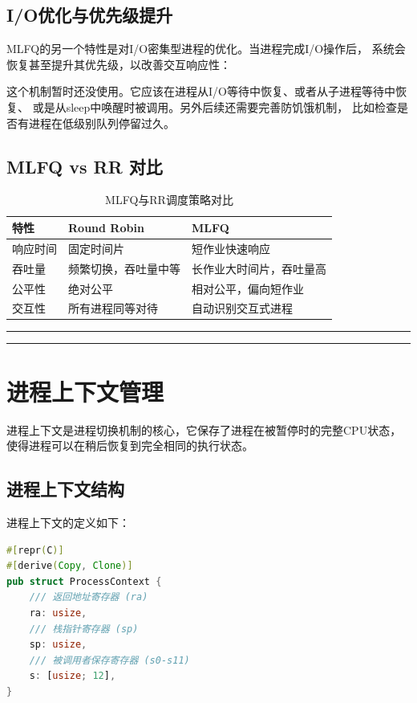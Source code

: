 \subsection{I/O优化与优先级提升}

MLFQ的另一个特性是对I/O密集型进程的优化。当进程完成I/O操作后，
系统会恢复甚至提升其优先级，以改善交互响应性：

这个机制暂时还没使用。它应该在进程从I/O等待中恢复、或者从子进程等待中恢复、
或是从sleep中唤醒时被调用。另外后续还需要完善防饥饿机制，
比如检查是否有进程在低级别队列停留过久。

\subsection{MLFQ vs RR 对比}

\begin{table}[htbp]
\centering
\caption{MLFQ与RR调度策略对比}
\label{tab:mlfq-vs-rr}
\begin{tabular}{|l|l|l|}
\hline
\textbf{特性} & \textbf{Round Robin} & \textbf{MLFQ} \\
\hline
响应时间 & 固定时间片 & 短作业快速响应 \\
\hline
吞吐量 & 频繁切换，吞吐量中等 & 长作业大时间片，吞吐量高 \\
\hline
公平性 & 绝对公平 & 相对公平，偏向短作业 \\
\hline
交互性 & 所有进程同等对待 & 自动识别交互式进程 \\
\hline
\end{tabular}
\end{table}

\noindent
\rule{0.4\textwidth}{0.4pt}
\hfill
{}
\hfill
\rule{0.4\textwidth}{0.4pt}

\section{进程上下文管理}

进程上下文是进程切换机制的核心，它保存了进程在被暂停时的完整CPU状态，
使得进程可以在稍后恢复到完全相同的执行状态。

\subsection{进程上下文结构}

进程上下文的定义如下：

\begin{lstlisting}[language=Rust,caption={进程上下文结构}, label={lst:process-context}]
#[repr(C)]
#[derive(Copy, Clone)]
pub struct ProcessContext {
    /// 返回地址寄存器 (ra)
    ra: usize,
    /// 栈指针寄存器 (sp)
    sp: usize,
    /// 被调用者保存寄存器 (s0-s11)
    s: [usize; 12],
}
\end{lstlisting}

